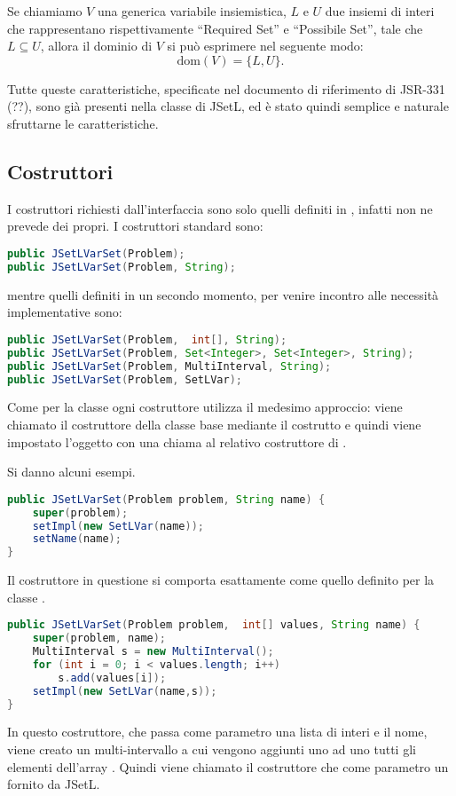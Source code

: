 Se chiamiamo $V$ una generica variabile insiemistica, $L$ e $U$ due insiemi di
interi che rappresentano rispettivamente ``Required Set'' e ``Possibile Set'',
tale che $L \subseteq U$, allora il dominio di $V$ si può esprimere nel
seguente modo:
\[
\textrm{dom}(V) = \{L,U\}.
\]
\begin{flushleft}
Tutte queste caratteristiche, specificate nel documento di riferimento di
JSR-331 (??), sono già presenti nella classe  di JSetL, ed è
stato quindi semplice e naturale sfruttarne le caratteristiche.
\end{flushleft}
\subsection{Costruttori}
I costruttori richiesti dall'interfaccia sono solo quelli definiti in
, infatti  non ne prevede dei propri. I 
costruttori standard sono:
\begin{lstlisting}[language = Java,
                   frame = single]
public JSetLVarSet(Problem);
public JSetLVarSet(Problem, String);
\end{lstlisting}
mentre quelli definiti in un secondo momento, per venire incontro alle 
necessità implementative sono:
\begin{lstlisting}[language = Java,
                   frame = single]
public JSetLVarSet(Problem,  int[], String);
public JSetLVarSet(Problem, Set<Integer>, Set<Integer>, String);
public JSetLVarSet(Problem, MultiInterval, String);
public JSetLVarSet(Problem, SetLVar);
\end{lstlisting}

Come per la classe  ogni costruttore utilizza il medesimo
approccio: viene chiamato il costruttore della classe base  mediante il 
costrutto
 e quindi viene impostato l'oggetto  con
una chiama al relativo costruttore di .

Si danno alcuni esempi.

\begin{lstlisting}[language = Java,
                   caption = {un costruttore standard di \files{JSetLVarSet}}]
public JSetLVarSet(Problem problem, String name) {
	super(problem);
	setImpl(new SetLVar(name));
	setName(name);
}
\end{lstlisting}
Il costruttore in questione si comporta esattamente come quello definito per
la classe .

\begin{lstlisting}[language = Java,
                   caption = {costruttore con lista di interi.}]
public JSetLVarSet(Problem problem,  int[] values, String name) {
	super(problem, name);
	MultiInterval s = new MultiInterval();
	for (int i = 0; i < values.length; i++)
		s.add(values[i]);
	setImpl(new SetLVar(name,s));
}
\end{lstlisting}
In questo costruttore, che passa come parametro una lista di interi e il nome,
viene creato un multi-intervallo a cui vengono aggiunti uno ad uno tutti gli
elementi dell'array . Quindi viene chiamato il costruttore
che come parametro un  fornito da JSetL.


